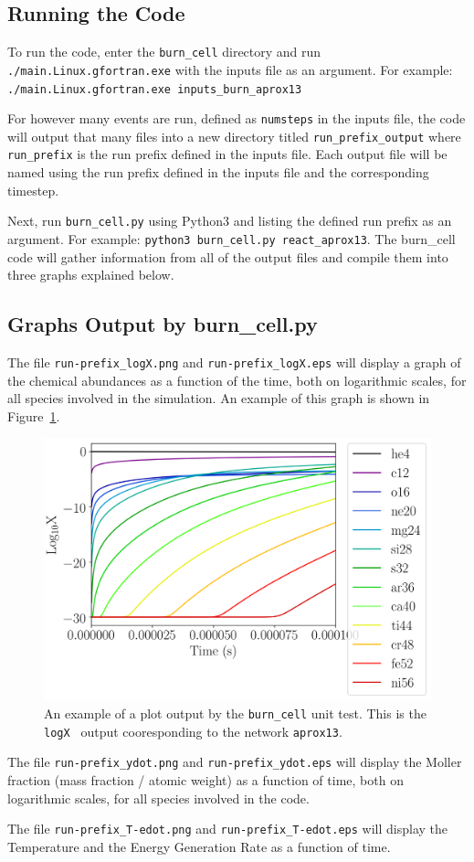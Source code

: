 \subsection{Running the Code}

To run the code, enter the {\tt burn\_cell} directory and run {\tt ./main.Linux.gfortran.exe} with the inputs file as an argument. 
For example: {\tt ./main.Linux.gfortran.exe inputs\_burn\_aprox13}

For however many events are run, defined as { \tt numsteps} in the inputs file, the code will output that many files into a new directory titled {\tt run\_prefix\_output} where {\tt run\_prefix} is the run prefix defined in the inputs file.
Each output file will be named using the run prefix defined in the inputs file and the corresponding timestep. 

Next, run {\tt burn\_cell.py} using Python3 and listing the defined run prefix as an argument.
For example: {\tt python3 burn\_cell.py react\_aprox13}. 
The burn\_cell code will gather information from all of the output files and compile them into three graphs explained below.

\subsection{Graphs Output by burn\_cell.py}

The file {\tt run-prefix\_logX.png} and {\tt run-prefix\_logX.eps} will display a graph of the chemical abundances as a function of the time, both on logarithmic scales, for all species involved in the simulation. 
An example of this graph is shown in Figure~\ref{fig:aprox13_logX}.

\begin{figure}
        \centering
	\includegraphics[width=4.5in]{react_aprox13_logX}
	\caption{An example of a plot output by the {\tt burn\_cell} unit test. This is the { \tt logX } output cooresponding to the network { \tt aprox13}.}
	\label{fig:aprox13_logX}
\end{figure}

The file {\tt run-prefix\_ydot.png} and {\tt run-prefix\_ydot.eps} will display the Moller fraction (mass fraction / atomic weight) as a function of time, both on logarithmic scales, for all species involved in the code. 

The file {\tt run-prefix\_T-edot.png} and {\tt run-prefix\_T-edot.eps} will display the Temperature and the Energy Generation Rate as a function of time. 
